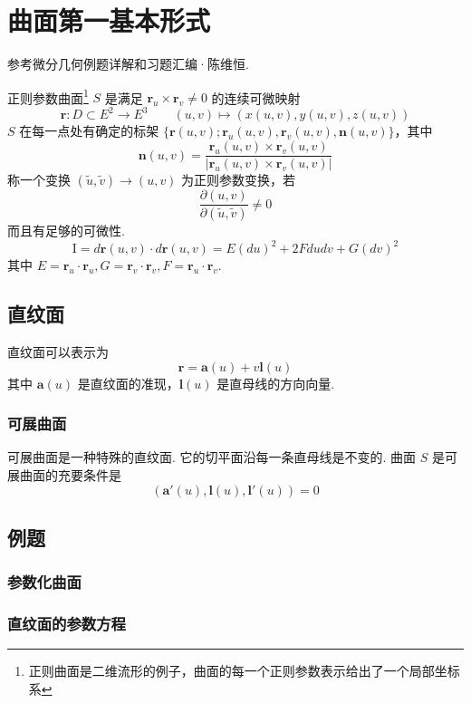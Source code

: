 \section{曲面第一基本形式}

参考微分几何例题详解和习题汇编·陈维恒.

正则参数曲面\footnote{正则曲面是二维流形的例子，曲面的每一个正则参数表示给出了一个局部坐标系} $S$ 是满足 $\boldsymbol{r}_{u}\times \boldsymbol{r}_{v}\neq0$ 的连续可微映射
\[
\boldsymbol{r}:D\subset E^2\to E^3\qquad (u,v)\mapsto(x(u,v),y(u,v),z(u,v))
\]
$S$ 在每一点处有确定的标架 $\{ \boldsymbol{r}(u,v);\boldsymbol{r}_{u}(u,v),\boldsymbol{r}_{v}(u,v),\boldsymbol{n}(u,v) \}$，其中
\[
\boldsymbol{n}(u,v)=\frac{\boldsymbol{r}_{u}(u,v)\times \boldsymbol{r}_{v}(u,v)}{\lvert \boldsymbol{r}_{u}(u,v)\times \boldsymbol{r}_{v}(u,v) \rvert }
\]
称一个变换 $(\widetilde{u},\widetilde{v})\to(u,v)$ 为正则参数变换，若
\[
\frac{ \partial (u,v) }{ \partial (\widetilde{u},\widetilde{v}) } \neq 0
\]
而且有足够的可微性.
\[
\mathrm{I}=d \boldsymbol{r}(u,v) \cdot d \boldsymbol{r}(u,v)=E(du)^2+2Fdudv+G(dv)^2
\]
其中 $E=\boldsymbol{r}_{u}\cdot \boldsymbol{r}_{u},G=\boldsymbol{r}_{v}\cdot \boldsymbol{r}_{v},F=\boldsymbol{r}_{u}\cdot \boldsymbol{r}_{v}$.

\subsection{直纹面}

直纹面可以表示为
\[
\boldsymbol{r}=\boldsymbol{a}(u)+v \boldsymbol{l}(u)
\]
其中 $\boldsymbol{a}(u)$ 是直纹面的准现，$\boldsymbol{l}(u)$ 是直母线的方向向量.

\subsubsection{可展曲面}

可展曲面是一种特殊的直纹面. 它的切平面沿每一条直母线是不变的. 曲面 $S$ 是可展曲面的充要条件是
\[
(\boldsymbol{a}'(u),\boldsymbol{l}(u),\boldsymbol{l}'(u))=0
\]
\subsection{例题}

\subsubsection{参数化曲面}

\subsubsection{直纹面的参数方程}

